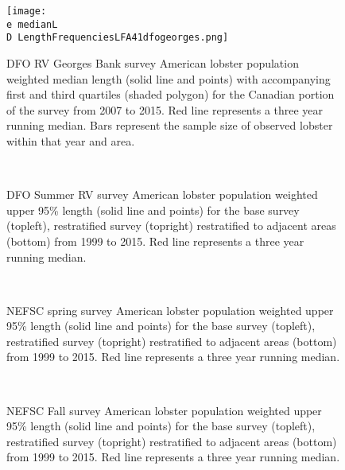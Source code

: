 \documentclass[11pt]{article}
\newcommand{\D}{.}
\newcommand{\e}{/backup/bio_data/bio.lobster/figures/} %
\begin{document}
\begin{figure}

    \texttt{[image: \\e medianL\\D LengthFrequenciesLFA41dfogeorges.png]}
    \caption{DFO RV Georges Bank survey American lobster population weighted median length (solid line and points) with accompanying first and third quartiles (shaded polygon) for the Canadian portion of the survey from 2007 to 2015. Red line represents a three year running median. Bars represent the sample size of observed lobster within that year and area.}

\end{figure}




\begin{figure}
\centering
{}
\\
\caption{DFO Summer RV survey American lobster population weighted upper 95\% length (solid line and points) for the base survey (topleft), restratified survey (topright) restratified to adjacent areas (bottom) from 1999 to 2015. Red line represents a three year running median. }
\end{figure}
\clearpage


\begin{figure}
\centering
{}
\\
\caption{NEFSC spring survey American lobster population weighted upper 95\% length (solid line and points) for the base survey (topleft), restratified survey (topright) restratified to adjacent areas (bottom) from 1999 to 2015. Red line represents a three year running median.}
\end{figure}
\clearpage



\begin{figure}
\centering
{}
\\
\caption{NEFSC Fall survey American lobster population weighted upper 95\% length (solid line and points) for the base survey (topleft), restratified survey (topright) restratified to adjacent areas (bottom) from 1999 to 2015. Red line represents a three year running median.}
\end{figure}
\clearpage
\end{document}
